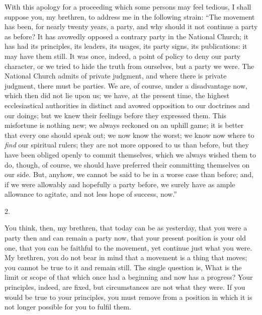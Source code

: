 With this apology for a proceeding which some persons may feel
tedious, I shall suppose you, my brethren, to address me in the
following strain: ``The movement has been, for nearly twenty
years, a party, and why should it not continue a party as before? It
has avowedly opposed a contrary party in the National Church; it has
had its principles, its leaders, its usages, its party signs, its
publications: it may have them still. It was once, indeed, a point of
policy to deny our party character, or we tried to hide the truth from
ourselves, but a party we were. The National Church admits of private
judgment, and where there is private judgment, there must be parties.
We are, of course, under a disadvantage now, which then did not lie
upon us; we have, at the present time, the highest ecclesiastical
authorities in distinct and avowed opposition to our doctrines and our
doings; but we knew their feelings before they expressed them. This
misfortune is nothing new; we always reckoned on an uphill game; it is
better that every one should speak out; we now know the worst; we know
now where to \emph{find} our spiritual rulers; they are not more
opposed to us than before, but they have been obliged openly to commit
themselves, which we always wished them to do, though, of course, we
should have preferred their committing themselves on our side. But,
anyhow, we cannot be said to be in a worse case than before; and, if
we were allowably and hopefully a party before, we surely have as
ample allowance to agitate, and not less hope of success, now.''

2.

You think, then, my brethren, that today can be as yesterday, that
you were a party then and can remain a party now, that your present
position is your old one, that you can be faithful to the movement,
yet continue just what you were. My brethren, you do not bear in mind
that a movement is a thing that moves; you cannot be true to it and
remain still. The single question is, What is the limit or scope of
that which once had a beginning and now has a progress? Your
principles, indeed, are fixed, but circumstances are not what they
were. If you would be true to your principles, you must remove from a
position in which it is not longer possible for you to fulfil them.

